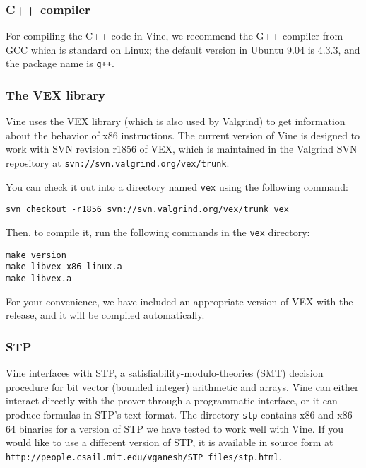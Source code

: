 \documentclass[11pt,onecolumn]{article}
\let\url\nolinkurl %
\begin{document}
\subsubsection{C++ compiler}

For compiling the C++ code in Vine, we recommend the G++ compiler from
GCC which is standard on Linux; the default version in Ubuntu 9.04 is
4.3.3, and the package name is {\tt g++}.

\subsubsection{\label{sec:vex}The VEX library}

Vine uses the VEX library (which is also used by Valgrind) to get
information about the behavior of x86 instructions.
%
The current version of Vine is designed to work with SVN revision
r1856 of VEX, which is maintained in the Valgrind SVN repository at
\url{svn://svn.valgrind.org/vex/trunk}.
%
\begin{svn}%
You can check it out into a directory named {\tt vex} using the
following command:

\begin{Verbatim}[frame=lines, framesep=.5em]
svn checkout -r1856 svn://svn.valgrind.org/vex/trunk vex
\end{Verbatim}

Then, to compile it, run the following commands in the {\tt vex}
directory:

\begin{Verbatim}[frame=lines, framesep=.5em]
make version
make libvex_x86_linux.a
make libvex.a
\end{Verbatim}
\end{svn}
\begin{release}
For your convenience, we have included an appropriate version of VEX
with the release, and it will be compiled automatically.
\end{release}

\subsubsection{STP}

Vine interfaces with STP, a satisfiability-modulo-theories (SMT)
decision procedure for bit vector (bounded integer) arithmetic and
arrays.
%
Vine can either interact directly with the prover through a
programmatic interface, or it can produce formulas in STP's text
format.
%
The directory {\tt stp} contains x86 and x86-64 binaries for a version
of STP we have tested to work well with Vine.
%
If you would like to use a different version of STP, it is available
in source form at
\url{http://people.csail.mit.edu/vganesh/STP_files/stp.html}.
\end{document}

